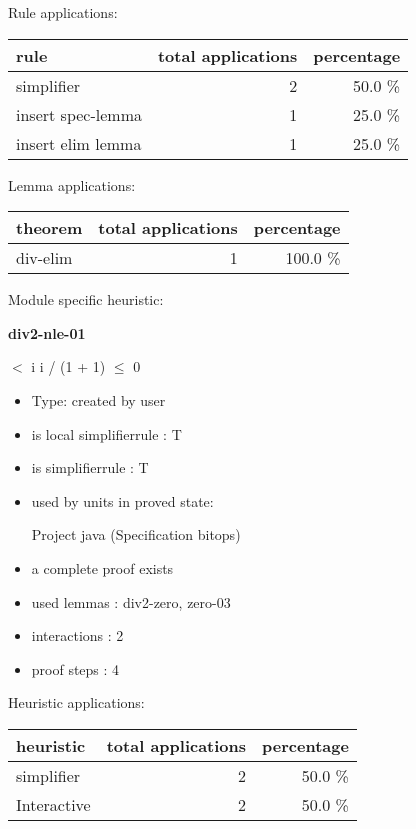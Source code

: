 \documentclass[a4paper]{article}
\begin{document}
Rule applications:

\begin{supertabular}{l|r|r}
rule	        & total applications & percentage \\ \hline
simplifier & 2 & 50.0 \% \\
insert spec-lemma & 1 & 25.0 \% \\
insert elim lemma & 1 & 25.0 \% \\

\end{supertabular}

Lemma applications:

\begin{supertabular}{l|r|r}
theorem	        & total applications & percentage \\ \hline
div-elim & 1 & 100.0 \% \\

\end{supertabular}

Module specific heuristic:

\pagebreak

{\LARGE\bf div2-nle-01}\label{lemma-div2-nle-01}

\medskip

  $<$ i \Imp \Not i / (1 + 1) $\le$ 0

\begin{itemize}

\item Type: created by user

\item is local simplifierrule : T
\item is simplifierrule : T
\item used by units in proved state:

Project java (Specification bitops)
\item       a complete proof exists
\item       used lemmas  : div2-zero, zero-03
\item       interactions : 2
\item       proof steps  : 4
\end{itemize}

\medskip


Heuristic applications:

\begin{supertabular}{l|r|r}
heuristic	& total applications & percentage \\ \hline
simplifier & 2 & 50.0 \% \\
Interactive & 2 & 50.0 \% \\

\end{supertabular}
\end{document}
